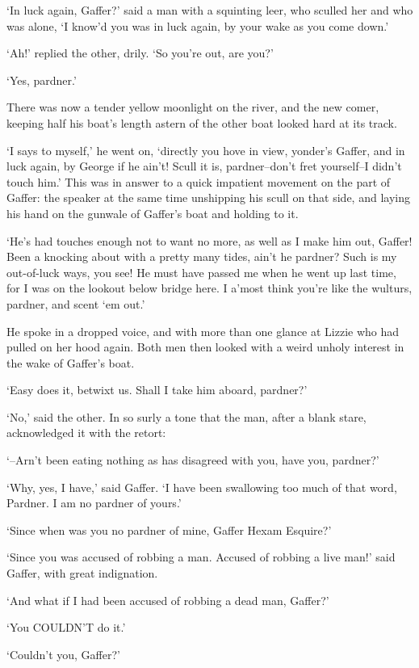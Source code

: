 ‘In luck again, Gaffer?’ said a man with a squinting leer, who sculled
her and who was alone, ‘I know’d you was in luck again, by your wake as
you come down.’

‘Ah!’ replied the other, drily. ‘So you’re out, are you?’

‘Yes, pardner.’

There was now a tender yellow moonlight on the river, and the new comer,
keeping half his boat’s length astern of the other boat looked hard at
its track.

‘I says to myself,’ he went on, ‘directly you hove in view, yonder’s
Gaffer, and in luck again, by George if he ain’t! Scull it is,
pardner--don’t fret yourself--I didn’t touch him.’ This was in answer
to a quick impatient movement on the part of Gaffer: the speaker at the
same time unshipping his scull on that side, and laying his hand on the
gunwale of Gaffer’s boat and holding to it.

‘He’s had touches enough not to want no more, as well as I make him
out, Gaffer! Been a knocking about with a pretty many tides, ain’t he
pardner? Such is my out-of-luck ways, you see! He must have passed me
when he went up last time, for I was on the lookout below bridge here. I
a’most think you’re like the wulturs, pardner, and scent ‘em out.’

He spoke in a dropped voice, and with more than one glance at Lizzie who
had pulled on her hood again. Both men then looked with a weird unholy
interest in the wake of Gaffer’s boat.

‘Easy does it, betwixt us. Shall I take him aboard, pardner?’

‘No,’ said the other. In so surly a tone that the man, after a blank
stare, acknowledged it with the retort:

‘--Arn’t been eating nothing as has disagreed with you, have you,
pardner?’

‘Why, yes, I have,’ said Gaffer. ‘I have been swallowing too much of
that word, Pardner. I am no pardner of yours.’

‘Since when was you no pardner of mine, Gaffer Hexam Esquire?’

‘Since you was accused of robbing a man. Accused of robbing a live man!’
said Gaffer, with great indignation.

‘And what if I had been accused of robbing a dead man, Gaffer?’

‘You COULDN’T do it.’

‘Couldn’t you, Gaffer?’

